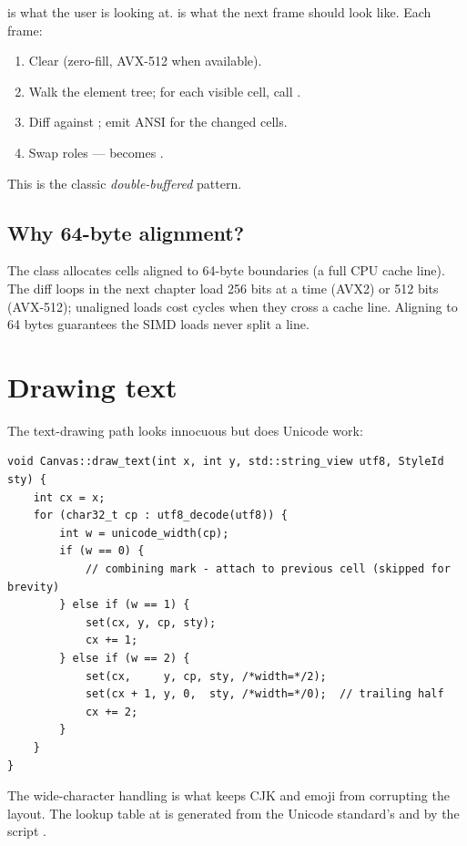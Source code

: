  is what the user is looking at.  is what
the next frame should look like. Each frame:

\begin{enumerate}[leftmargin=*]
  \item Clear  (zero-fill, AVX-512  when
    available).
  \item Walk the element tree; for each visible cell, call
    .
  \item Diff  against ; emit ANSI for the
    changed cells.
  \item Swap roles ---  becomes .
\end{enumerate}

This is the classic \emph{double-buffered} pattern.

\subsection{Why 64-byte alignment?}

The  class allocates cells aligned to 64-byte
boundaries (a full CPU cache line). The diff loops in the next chapter
load 256 bits at a time (AVX2) or 512 bits (AVX-512); unaligned loads
cost cycles when they cross a cache line. Aligning to 64 bytes
guarantees the SIMD loads never split a line.

\section{Drawing text}

The text-drawing path looks innocuous but does Unicode work:

\begin{lstlisting}
void Canvas::draw_text(int x, int y, std::string_view utf8, StyleId sty) {
    int cx = x;
    for (char32_t cp : utf8_decode(utf8)) {
        int w = unicode_width(cp);
        if (w == 0) {
            // combining mark - attach to previous cell (skipped for brevity)
        } else if (w == 1) {
            set(cx, y, cp, sty);
            cx += 1;
        } else if (w == 2) {
            set(cx,     y, cp, sty, /*width=*/2);
            set(cx + 1, y, 0,  sty, /*width=*/0);  // trailing half
            cx += 2;
        }
    }
}
\end{lstlisting}

The wide-character handling is what keeps CJK and emoji from
corrupting the layout. The lookup table at
 is generated
from the Unicode standard's  and
 by the script
.

